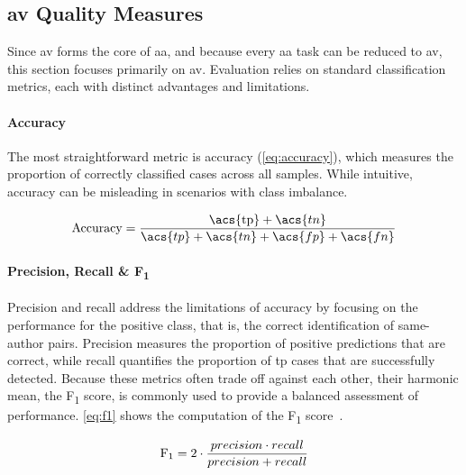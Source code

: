 \subsection{\acs{av} Quality Measures}
\label{subsec:av_quality_measures}

Since \ac{av} forms the core of \ac{aa}, and because every \ac{aa} task can be reduced to \ac{av}, this section focuses primarily on \ac{av}. 
Evaluation relies on standard classification metrics, each with distinct advantages and limitations.

\paragraph{Accuracy}
The most straightforward metric is accuracy (\autoref{eq:accuracy}), which measures the proportion of correctly classified cases across all samples. 
While intuitive, accuracy can be misleading in scenarios with class imbalance. 

\begin{equation}\label{eq:accuracy}
    \text{Accuracy} = \frac{\text{\acs{tp}} + \acs{tn}}{\acs{tp} + \acs{tn} + \acs{fp} + \acs{fn}}
\end{equation}

\paragraph{Precision, Recall \& F\textsubscript{1}}
Precision and recall address the limitations of accuracy by focusing on the performance for the positive class, that is, the correct identification of same-author pairs. 
Precision measures the proportion of positive predictions that are correct, while recall quantifies the proportion of \ac{tp} cases that are successfully detected. 
Because these metrics often trade off against each other, their harmonic mean, the F\textsubscript{1} score, is commonly used to provide a balanced assessment of performance. 
\autoref{eq:f1} shows the computation of the F\textsubscript{1} score~\citep{neal_surveying_2018}.

\begin{equation}\label{eq:f1}
     \text{F\textsubscript{1}} = 2 \cdot \frac{precision \cdot recall}{precision + recall}
\end{equation}

